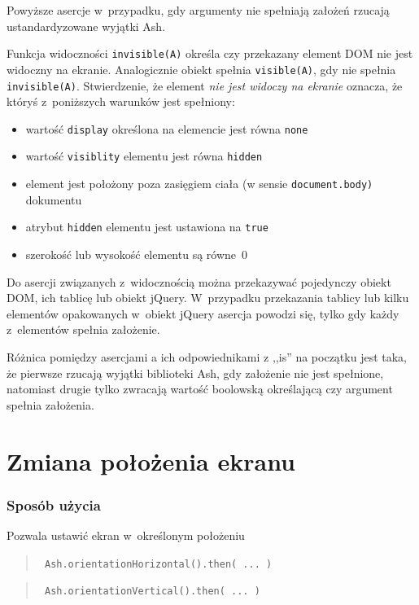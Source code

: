 \documentclass[brudnopis]{xmgr}
\begin{document}
Powyższe asercje w~przypadku, gdy argumenty nie spełniają założeń rzucają ustandardyzowane wyjątki Ash. 

Funkcja widoczności \texttt{invisible(A)} określa czy przekazany element DOM nie jest widoczny na ekranie. Analogicznie obiekt spełnia \texttt{visible(A)}, gdy nie spełnia \texttt{invisible(A)}. Stwierdzenie, że element {\it nie jest widoczy na ekranie} oznacza, że któryś z~poniższych warunków jest spełniony:

\begin{itemize}
  \item wartość \texttt{display} określona na elemencie jest równa \texttt{none}
  \item wartość \texttt{visiblity} elementu jest równa \texttt{hidden}
  \item element jest położony poza zasięgiem ciała (w sensie \texttt{document.body)} dokumentu
  \item atrybut \texttt{hidden} elementu jest ustawiona na \texttt{true}
  \item szerokość lub wysokość elementu są równe~0
\end{itemize}

Do asercji związanych z~widocznością można przekazywać pojedynczy obiekt DOM, ich tablicę lub obiekt jQuery. W~przypadku przekazania tablicy lub kilku elementów opakowanych w~obiekt jQuery asercja powodzi się, tylko gdy każdy z~elementów spełnia założenie. 

Różnica pomiędzy asercjami a ich odpowiednikami z ,,is'' na początku jest taka, że pierwsze rzucają wyjątki biblioteki Ash, gdy założenie nie jest spełnione, natomiast drugie tylko zwracają wartość boolowską określającą czy argument spełnia założenia.  

\section{Zmiana położenia ekranu}

\subsubsection{Sposób użycia}
Pozwala ustawić ekran w~określonym położeniu

\begin{quote}
  \texttt{  Ash.orientationHorizontal().then( ... )  }
\end{quote}

\begin{quote}
  \texttt{  Ash.orientationVertical().then( ... )  } 
\end{quote}
\end{document}
